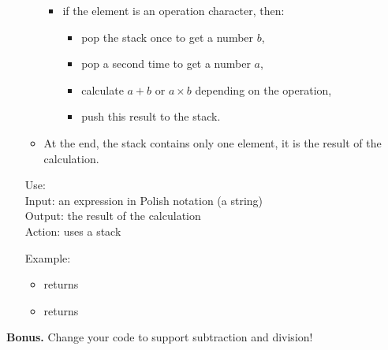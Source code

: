 \documentclass[11pt,class=report,crop=false]{standalone}
\begin{document}
\begin{activite}
\begin{enumerate}
\begin{algorithme}
\begin{itemize}
\begin{itemize}
     \item if the element is an operation character, then:
       \begin{itemize}
         \item pop the stack once to get a number $b$,
         \item pop a second time to get a number $a$,
         \item calculate $a+b$ or $a \times b$ depending on the operation,
         \item push this result to the stack.
       \end{itemize}
     \end{itemize}   
   \item At the end, the stack contains only one element, it is the result of the calculation.
   
 \end{itemize}  
 \end{algorithme}

\begin{fonction}
  Use:  \\
  Input: an expression in Polish notation (a string) \\
  Output: the result of the calculation \\
  Action: uses a stack
   
  \medskip
   
  Example: 
  \begin{itemize}
    \item {} returns 
    \item {} returns 
    \end{itemize}    
\end{fonction}  
  
\end{enumerate} 

\medskip

\textbf{Bonus.} Change your code to support subtraction and division!
\end{activite}



\end{document}
